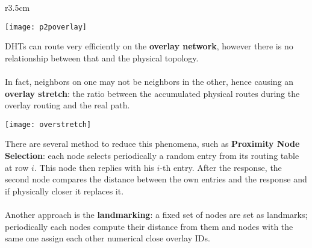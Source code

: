 \begin{wrapfigure}[7]{r}{3.5cm}
	\vspace{-1cm}
	\begin{center}
		\texttt{[image: p2poverlay]}
	\end{center}
\end{wrapfigure}
DHTs can route very efficiently on the \textbf{overlay network}, however there is no relationship between that and the physical topology.\\\\
In fact, neighbors on one may not be neighbors in the other, hence causing an \textbf{overlay stretch}: the ratio between the accumulated physical routes during the overlay routing and the real path.
\begin{center}
	\texttt{[image: overstretch]}
\end{center}
There are several method to reduce this phenomena, such as \textbf{Proximity Node Selection}: each node selects periodically a random entry from its routing table at row $i$. This node then replies with his $i$-th entry. After the response, the second node compares the distance  between the own entries and the response and if physically closer it replaces it.\\\\
Another approach is the \textbf{landmarking}: a fixed set of nodes are set as landmarks; periodically each nodes compute their distance from them and nodes with the same one assign each other numerical close overlay IDs.